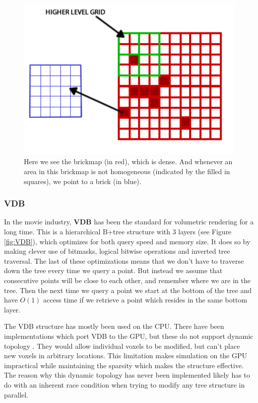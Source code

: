 \begin{figure}
    \centering
    \includegraphics[width=\linewidth]{figures/brickmap.png}
    \caption{Here we see the brickmap (in red), which is dense. And whenever an area in this brickmap is not homogeneous (indicated by the filled in squares), we point to a brick (in blue). \cite{van2015real}}
    \label{fig:brickmap}
\end{figure}
\subsubsection{VDB} \label{introduction:voxel_data_structures:vdb}
In the movie industry, \textbf{VDB} \cite{museth2013vdb} has been the standard for volumetric rendering for a long time. This is a hierarchical B+tree structure with 3 layers (see Figure \ref{fig:VDB}), which optimizes for both query speed and memory size. It does so by making clever use of bitmasks, logical bitwise operations and inverted tree traversal. The last of these optimizations means that we don't have to traverse down the tree every time we query a point. But instead we assume that consecutive points will be close to each other, and remember where we are in the tree. Then the next time we query a point we start at the bottom of the tree and have $O(1)$ access time if we retrieve a point which resides in the same bottom layer.

The VDB structure has mostly been used on the CPU. There have been implementations which port VDB to the GPU, but these do not support dynamic topology \cite{hoetzlein2016gvdb} \cite{museth2021nanovdb}. They would allow individual voxels to be modified, but can't place new voxels in arbitrary locations. This limitation makes simulation on the GPU impractical while maintaining the sparsity which makes the structure effective. The reason why this dynamic topology has never been implemented likely has to do with an inherent race condition when trying to modify any tree structure in parallel.

